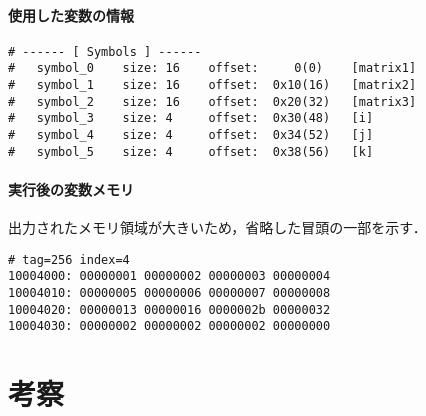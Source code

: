\paragraph*{使用した変数の情報}
\begin{Verbatim}[numbers=none, frame=single,
  fontsize=\small, baselinestretch=0.8]
# ------ [ Symbols ] ------
# 	symbol_0 	size: 16 	offset:     0(0) 	[matrix1]
# 	symbol_1 	size: 16 	offset:  0x10(16) 	[matrix2]
# 	symbol_2 	size: 16 	offset:  0x20(32) 	[matrix3]
# 	symbol_3 	size: 4 	offset:  0x30(48) 	[i]
# 	symbol_4 	size: 4 	offset:  0x34(52) 	[j]
# 	symbol_5 	size: 4 	offset:  0x38(56) 	[k]  
\end{Verbatim}

\paragraph*{実行後の変数メモリ}
出力されたメモリ領域が大きいため，省略した冒頭の一部を示す．

\begin{Verbatim}[numbers=none, frame=single,
  fontsize=\small, baselinestretch=0.8]
# tag=256 index=4
10004000: 00000001 00000002 00000003 00000004
10004010: 00000005 00000006 00000007 00000008
10004020: 00000013 00000016 0000002b 00000032
10004030: 00000002 00000002 00000002 00000000
\end{Verbatim}


\section{考察}





